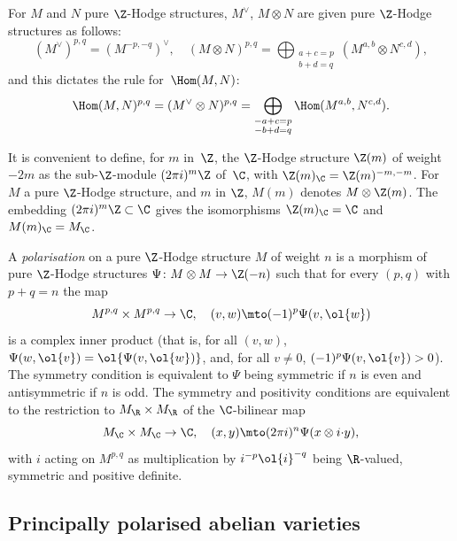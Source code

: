 For $M$ and $N$ pure $\Z$-Hodge structures, $M^\vee$, $M\otimes N$ are
given pure $\Z$-Hodge structures as follows:
\[
(M^\vee)^{p,q} = (M^{-p,-q})^\vee,\quad
(M\otimes N)^{p,q} = \bigoplus_{\substack{a+c=p\\ b+d=q}}
(M^{a,b}\otimes N^{c,d}),
\]
and this dictates the rule for~$\Hom(M,N)$:
\[
\Hom(M,N)^{p,q} = (M^\vee\otimes N)^{p,q}
=\bigoplus_{\substack{-a+c=p\\ -b+d=q}}
\Hom(M^{a,b},N^{c,d}).
\]

It is convenient to define, for $m$ in~$\Z$, the $\Z$-Hodge structure
$\Z(m)$ of weight $-2m$ as the sub-$\Z$-module $(2\pi i)^m\Z$ of~$\C$,
with $\Z(m)_\C=\Z(m)^{-m,-m}$. For $M$ a pure $\Z$-Hodge structure,
and $m$ in $\Z$, $M(m)$ denotes $M\otimes\Z(m)$. The embedding $(2\pi
i)^m\Z\subset\C$ gives the isomorphisms $\Z(m)_\C=\C$ and
$M(m)_\C=M_\C$.

A \emph{polarisation} on a pure $\Z$-Hodge structure $M$ of weight $n$
is a morphism of pure $\Z$-Hodge structures $\Psi\colon M\otimes
M\to\Z(-n)$ such that for every $(p,q)$ with $p+q=n$ the map
\[
M^{p,q}\times M^{p,q}\to \C,\quad (v,w)\mto (-1)^p\Psi(v,\ol{w})
\]
is a complex inner product (that is, for all $(v,w)$,
$\Psi(w,\ol{v})=\ol{\Psi(v,\ol{w})}$, and, for all $v\neq0$,
$(-1)^p\Psi(v,\ol{v})>0$). The symmetry condition is equivalent to
$\Psi$ being symmetric if $n$ is even and
antisymmetric if $n$ is odd. The symmetry and positivity conditions are
equivalent to the restriction to $M_\R\times M_\R$ of the
$\C$-bilinear map
\[
M_\C\times M_\C\to\C,\quad (x,y)\mto (2\pi i)^n\Psi(x\otimes i{\cdot}y),
\]
with $i$ acting on $M^{p,q}$ as multiplication by $i^{-p}\ol{i}^{-q}$
being $\R$-valued, symmetric and positive definite.

\subsection{Principally polarised abelian varieties}
\label{sec:ppavs}

